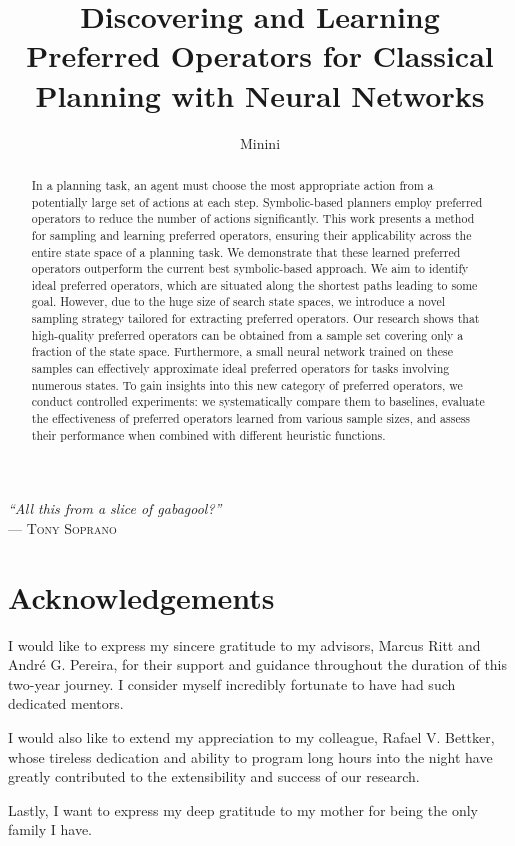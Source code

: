 \documentclass[ppgc,diss,english]{iiufrgs}
\title{Discovering and Learning Preferred Operators for Classical Planning with Neural Networks}
\author{Minini}{Pedro Probst}
\begin{document}
\maketitle

\clearpage
\begin{flushright}
\mbox{}\vfill
{\sffamily\itshape
    ``All this from a slice of gabagool?''\\}
--- \textsc{Tony Soprano}
\end{flushright}

\chapter*{Acknowledgements}

I would like to express my sincere gratitude to my advisors, Marcus Ritt and André G. Pereira, for their support and guidance throughout the duration of this two-year journey. I consider myself incredibly fortunate to have had such dedicated mentors.

I would also like to extend my appreciation to my colleague, Rafael V. Bettker, whose tireless dedication and ability to program long hours into the night have greatly contributed to the extensibility and success of our research.

Lastly, I want to express my deep gratitude to my mother for being the only family I have.

\begin{abstract}
In a planning task, an agent must choose the most appropriate action from a potentially large set of actions at each step. Symbolic-based planners employ preferred operators to reduce the number of actions significantly. This work presents a method for sampling and learning preferred operators, ensuring their applicability across the entire state space of a planning task. We demonstrate that these learned preferred operators outperform the current best symbolic-based approach.
We aim to identify ideal preferred operators, which are situated along the shortest paths leading to some goal. However, due to the huge size of search state spaces, we introduce a novel sampling strategy tailored for extracting preferred operators. Our research shows that high-quality preferred operators can be obtained from a sample set covering only a fraction of the state space. Furthermore, a small neural network trained on these samples can effectively approximate ideal preferred operators for tasks involving numerous states.
To gain insights into this new category of preferred operators, we conduct controlled experiments: we systematically compare them to baselines, evaluate the effectiveness of preferred operators learned from various sample sizes, and assess their performance when combined with different heuristic functions.
\end{abstract}
\end{document}
